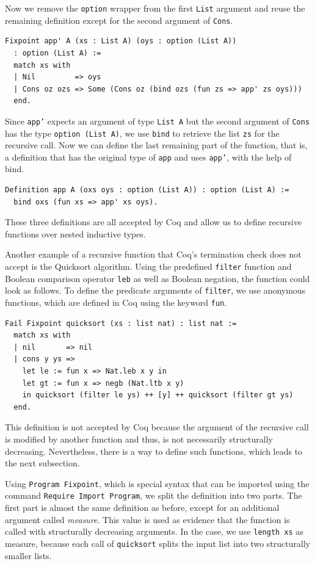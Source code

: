 \documentclass[a4paper, 11pt, fleqn, twoside, abstract=on]{scrreprt}
\newcommand{\cinl}[1]{\texttt{#1}}
\begin{document}
Now we remove the \cinl{option} wrapper from the first \cinl{List} argument and reuse the remaining definition except for the second argument of \cinl{Cons}.

\begin{verbatim}
Fixpoint app' A (xs : List A) (oys : option (List A)) 
  : option (List A) :=
  match xs with
  | Nil         => oys
  | Cons oz ozs => Some (Cons oz (bind ozs (fun zs => app' zs oys)))
  end.
\end{verbatim}

Since \cinl{app'} expects an argument of type \cinl{List A} but the second argument of \cinl{Cons} has the type \cinl{option (List A)}, we use \cinl{bind} to retrieve the list \cinl{zs} for the recursive call.
Now we can define the last remaining part of the function, that is, a definition that has the original type of \cinl{app} and uses \cinl{app'}, with the help of bind.

\begin{verbatim}
Definition app A (oxs oys : option (List A)) : option (List A) :=
  bind oxs (fun xs => app' xs oys).
\end{verbatim}

These three definitions are all accepted by Coq and allow us to define recursive functions over nested inductive types.

Another example of a recursive function that Coq's termination check does not accept is the Quicksort algorithm.
Using the predefined \cinl{filter} function and Boolean comparison operator \cinl{leb} as well as Boolean negation, the function could look as follows.
To define the predicate arguments of \cinl{filter}, we use anonymous functions, which are defined in Coq using the keyword \cinl{fun}.

\begin{verbatim}
Fail Fixpoint quicksort (xs : list nat) : list nat :=
  match xs with
  | nil       => nil
  | cons y ys =>
    let le := fun x => Nat.leb x y in
    let gt := fun x => negb (Nat.ltb x y)
    in quicksort (filter le ys) ++ [y] ++ quicksort (filter gt ys)
  end.
\end{verbatim}

This definition is not accepted by Coq because the argument of the recursive call is modified by another function and thus, is not necessarily structurally decreasing.
Nevertheless, there is a way to define such functions, which leads to the next subsection.

Using \cinl{Program Fixpoint}, which is special syntax that can be imported using the command \cinl{Require Import Program}, we split the definition into two parts.
The first part is almost the same definition as before, except for an additional argument called \textit{measure}.
This value is used as evidence that the function is called with structurally decreasing arguments.
In the case, we use \cinl{length xs} as measure, because each call of \cinl{quicksort} splits the input list into two structurally smaller lists.
\end{document}
